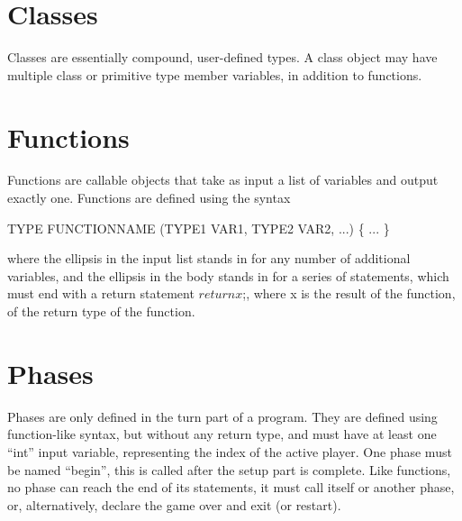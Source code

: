 \documentclass{article}
\begin{document}
\section{Classes}
Classes are essentially compound, user-defined types. A class object may have
multiple class or primitive type member variables, in addition to functions.

\section{Functions}
Functions are callable objects that take as input a list of variables and output
exactly one. Functions are defined using the syntax
\begin{algorithmic}
\State TYPE FUNCTIONNAME (TYPE1 VAR1, TYPE2 VAR2, ...) \{
\State ...
\State \}
\end{algorithmic}

where the ellipsis in the input list stands in for any number of additional
variables, and the ellipsis in the body stands in for a series of statements,
which must end with a return statement $return x$;, where x is the result of
the function, of the return type of the function.

\section{Phases}
Phases are only defined in the turn part of a program. They are defined using
function-like syntax, but without any return type, and must have at least one
``int'' input variable, representing the index of the active player.
 One phase must be named
``begin'', this is called after the setup part is complete. Like functions, no
phase can reach the end of its statements, it must call itself or another phase,
or, alternatively, declare the game over and exit (or restart).
\end{document}
